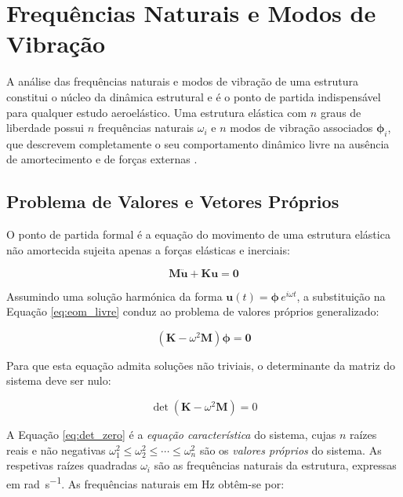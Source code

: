 \documentclass[11pt,oneside,a4paper,final]{report}
\begin{document}
\section{Frequências Naturais e Modos de Vibração}
\label{sec:freq_naturais}

A análise das frequências naturais e modos de vibração de uma estrutura constitui o núcleo da dinâmica estrutural e é o ponto de partida indispensável para qualquer estudo aeroelástico. Uma estrutura elástica com $n$ graus de liberdade possui $n$ frequências naturais $\omega_i$ e $n$ modos de vibração associados $\boldsymbol{\phi}_i$, que descrevem completamente o seu comportamento dinâmico livre na ausência de amortecimento e de forças externas \cite{Craig2006, Clough1993}.

\subsection{Problema de Valores e Vetores Próprios}

O ponto de partida formal é a equação do movimento de uma estrutura elástica não amortecida sujeita apenas a forças elásticas e inerciais:

\begin{equation}
    \mathbf{M}\ddot{\mathbf{u}} + \mathbf{K}\mathbf{u} = \mathbf{0}
    \label{eq:eom_livre}
\end{equation}

Assumindo uma solução harmónica da forma $\mathbf{u}(t) = \boldsymbol{\phi} \, e^{i\omega t}$, a substituição na Equação \eqref{eq:eom_livre} conduz ao problema de valores próprios generalizado:

\begin{equation}
    \left( \mathbf{K} - \omega^2 \mathbf{M} \right) 
    \boldsymbol{\phi} = \mathbf{0}
    \label{eq:eigenvalue}
\end{equation}

Para que esta equação admita soluções não triviais, o determinante da matriz do sistema deve ser nulo:

\begin{equation}
    \det\left( \mathbf{K} - \omega^2 \mathbf{M} \right) = 0
    \label{eq:det_zero}
\end{equation}

A Equação \eqref{eq:det_zero} é a \textit{equação característica} do sistema, cujas $n$ raízes reais e não negativas $\omega_1^2 \leq \omega_2^2 \leq \cdots \leq \omega_n^2$ são os \textit{valores próprios} do sistema. As respetivas raízes quadradas $\omega_i$ são as frequências naturais da estrutura, expressas em \si{\radian\per\second}. As frequências naturais em \si{\hertz} obtêm-se por:
\end{document}
